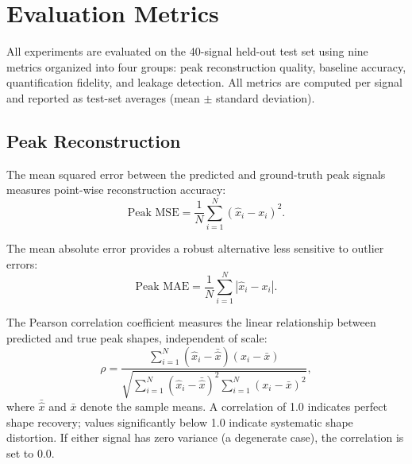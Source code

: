 \section{Evaluation Metrics}
\label{sec:exp_metrics}

All experiments are evaluated on the 40-signal held-out test set using nine metrics organized into four groups: peak reconstruction quality, baseline accuracy, quantification fidelity, and leakage detection. All metrics are computed per signal and reported as test-set averages (mean $\pm$ standard deviation).


\subsection{Peak Reconstruction}
\label{sec:exp_metrics_peak}

 The mean squared error between the predicted and ground-truth peak signals measures point-wise reconstruction accuracy:
\begin{equation}
    \text{Peak MSE} = \frac{1}{N} \sum_{i=1}^{N} (\hat{x}_i - x_i)^2.
    \label{eq:peak_mse}
\end{equation}

 The mean absolute error provides a robust alternative less sensitive to outlier errors:
\begin{equation}
    \text{Peak MAE} = \frac{1}{N} \sum_{i=1}^{N} |\hat{x}_i - x_i|.
    \label{eq:peak_mae}
\end{equation}

 The Pearson correlation coefficient measures the linear relationship between predicted and true peak shapes, independent of scale:
\begin{equation}
    \rho = \frac{\sum_{i=1}^{N} (\hat{x}_i - \bar{\hat{x}})(x_i - \bar{x})}{\sqrt{\sum_{i=1}^{N} (\hat{x}_i - \bar{\hat{x}})^2 \sum_{i=1}^{N} (x_i - \bar{x})^2}},
    \label{eq:peak_corr}
\end{equation}
where $\bar{\hat{x}}$ and $\bar{x}$ denote the sample means. A correlation of 1.0 indicates perfect shape recovery; values significantly below 1.0 indicate systematic shape distortion. If either signal has zero variance (a degenerate case), the correlation is set to 0.0.


